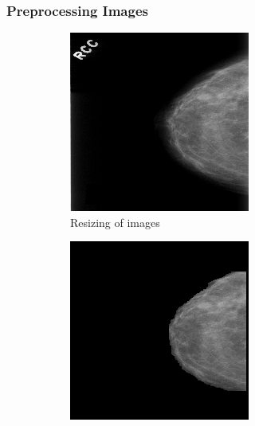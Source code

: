 \documentclass[sn-mathphys,Numbered]{sn-jnl}%
\theoremstyle{thmstyleone}%
\theoremstyle{thmstyletwo}%
\theoremstyle{thmstylethree}%
\begin{document}
\subsubsection{Preprocessing Images}\label{Preprocessing}
\begin{figure}[ht]
  \centering
  \begin{subfigure}{0.22\textwidth}
    \centering
    \includegraphics[width=\linewidth]{resized.png}
    \caption{Resizing of images}
  \end{subfigure}%
  \hfill
  \begin{subfigure}{0.22\textwidth}
    \centering
    \includegraphics[width=\linewidth]{artefacts_removed.png}

\end{subfigure}
\end{figure}
\end{document}
